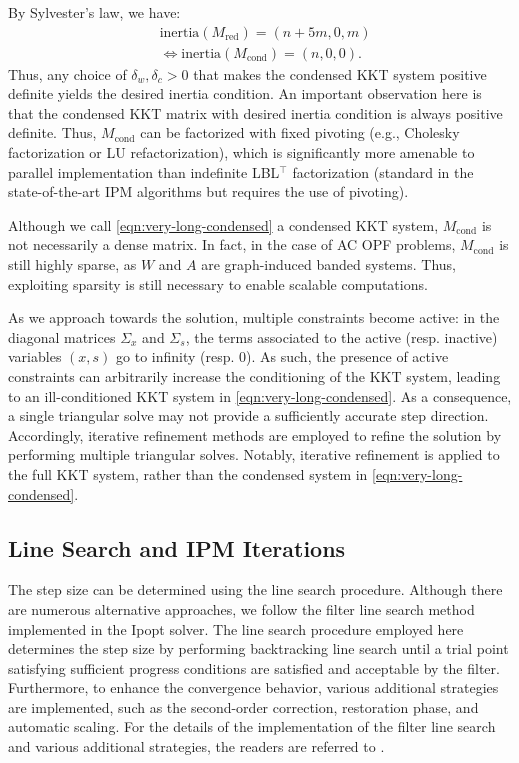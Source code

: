 By Sylvester's law, we have:
\begin{align*}
  &\text{inertia}(M_\text{red}) = (n+5m,0,m)\\
  &\iff \text{inertia}(M_\text{cond}) = (n,0,0).
\end{align*}
Thus, any choice of $\delta_w,\delta_c>0$ that makes the condensed KKT
system positive definite yields the desired inertia condition.
An important observation here is that the condensed KKT matrix
with desired inertia condition is always positive definite.
Thus, $M_{\text{cond}}$ can be factorized with fixed pivoting (e.g.,
Cholesky factorization or LU refactorization), which is significantly
more amenable to parallel implementation than indefinite LBL$^\top$
factorization (standard in the state-of-the-art IPM
algorithms but requires the use of pivoting).

Although we call \eqref{eqn:very-long-condensed} a condensed KKT system,
$M_\text{cond}$ is not necessarily a dense matrix. In fact, in the case of
AC OPF problems, $M_\text{cond}$ is still highly sparse, as $W$
and $A$ are graph-induced banded systems. Thus, exploiting sparsity is
still necessary to enable scalable computations.

As we approach towards the solution, multiple constraints become active:
in the diagonal matrices $\Sigma_x$ and $\Sigma_s$, the terms associated
to the active (resp. inactive) variables $(x, s)$ go to infinity
(resp. $0$).
As such, the presence of active constraints can arbitrarily
increase the conditioning of the KKT system, leading to
an ill-conditioned KKT system in \eqref{eqn:very-long-condensed}.
As a consequence, a single triangular solve may not provide a
sufficiently accurate step direction. Accordingly, iterative
refinement methods are employed to refine the solution by performing
multiple triangular solves. Notably, iterative refinement is applied
to the full KKT system, rather than the condensed system in
\eqref{eqn:very-long-condensed}.

\subsection{Line Search and IPM Iterations}

The step size can be determined using the line search procedure.
Although there are numerous alternative approaches, we follow the
filter line search method implemented in the Ipopt solver. The line
search procedure employed here determines the step size by performing
backtracking line search until a trial point satisfying sufficient
progress conditions are satisfied and acceptable by the
filter. Furthermore, to enhance the convergence behavior, various
additional strategies are implemented, such as the second-order
correction, restoration phase, and automatic scaling. For the details
of the implementation of the filter line search and various additional
strategies, the readers are referred to
\cite{wachter2006implementation}.

